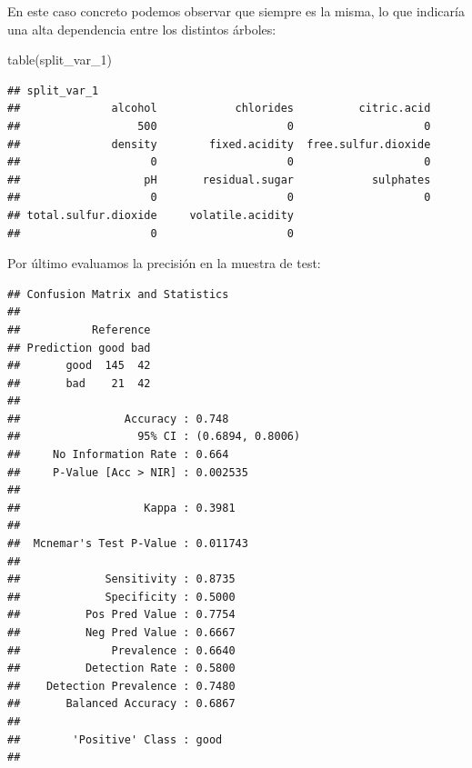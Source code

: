 \documentclass[
  spanish,
]{book}
\newenvironment{Shaded}{\begin{snugshade}}{\end{snugshade}}
\newcommand{\AttributeTok}[1]{\textcolor[rgb]{0.77,0.63,0.00}{#1}}
\newcommand{\FunctionTok}[1]{\textcolor[rgb]{0.00,0.00,0.00}{#1}}
\newcommand{\NormalTok}[1]{#1}
\newcommand{\OtherTok}[1]{\textcolor[rgb]{0.56,0.35,0.01}{#1}}
\newcommand{\SpecialCharTok}[1]{\textcolor[rgb]{0.00,0.00,0.00}{#1}}
\theoremstyle{break}
\theoremstyle{definition}
\theoremstyle{definition}
\theoremstyle{definition}
\theoremstyle{definition}
\theoremstyle{remark}
\begin{document}
En este caso concreto podemos observar que siempre es la misma, lo que indicaría una alta dependencia entre los distintos árboles:

\begin{Shaded}
\begin{Highlighting}[]
\FunctionTok{table}\NormalTok{(split\_var\_1)}
\end{Highlighting}
\end{Shaded}

\begin{verbatim}
## split_var_1
##              alcohol            chlorides          citric.acid 
##                  500                    0                    0 
##              density        fixed.acidity  free.sulfur.dioxide 
##                    0                    0                    0 
##                   pH       residual.sugar            sulphates 
##                    0                    0                    0 
## total.sulfur.dioxide     volatile.acidity 
##                    0                    0
\end{verbatim}

Por último evaluamos la precisión en la muestra de test:

\begin{Shaded}
\end{Shaded}

\begin{verbatim}
## Confusion Matrix and Statistics
## 
##           Reference
## Prediction good bad
##       good  145  42
##       bad    21  42
##                                           
##                Accuracy : 0.748           
##                  95% CI : (0.6894, 0.8006)
##     No Information Rate : 0.664           
##     P-Value [Acc > NIR] : 0.002535        
##                                           
##                   Kappa : 0.3981          
##                                           
##  Mcnemar's Test P-Value : 0.011743        
##                                           
##             Sensitivity : 0.8735          
##             Specificity : 0.5000          
##          Pos Pred Value : 0.7754          
##          Neg Pred Value : 0.6667          
##              Prevalence : 0.6640          
##          Detection Rate : 0.5800          
##    Detection Prevalence : 0.7480          
##       Balanced Accuracy : 0.6867          
##                                           
##        'Positive' Class : good            
## 
\end{verbatim}
\end{document}
